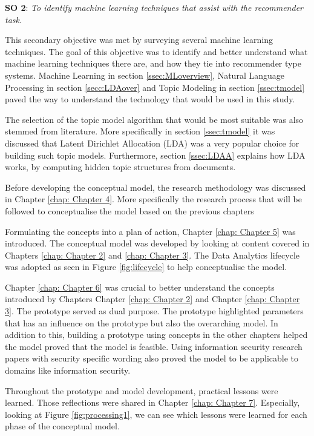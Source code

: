 \textbf{SO 2}: \textit{To identify machine learning techniques that assist with the recommender task.}

This secondary objective was met by surveying several machine learning techniques. The goal of this objective was to identify and better understand what machine learning techniques there are, and how they tie into recommender type systems.
Machine Learning in section \ref{ssec:MLoverview}, Natural Language Processing in section \ref{secc:LDAover} and Topic Modeling in section \ref{ssec:tmodel} paved the way to understand the technology that would be used in this study.

The selection of the topic model algorithm that would be most suitable was also stemmed from literature. More specifically in section \ref{ssec:tmodel} it was discussed that Latent Dirichlet Allocation (LDA) was a very popular choice for building such topic models. Furthermore, section \ref{ssec:LDAA} explains how LDA works, by computing hidden topic structures from documents.

Before developing the conceptual model, the research methodology was discussed in Chapter \ref{chap: Chapter 4}. More specifically the research process that will be followed to conceptualise the model based on the previous chapters

Formulating the concepts into a plan of action, Chapter \ref{chap: Chapter 5} was introduced. The conceptual model was developed by looking at content covered in Chapters \ref{chap: Chapter 2} and \ref{chap: Chapter 3}. The Data Analytics lifecycle was adopted as seen in Figure \ref{fig:lifecycle} to help conceptualise the model.

Chapter \ref{chap: Chapter 6} was crucial to better understand the concepts introduced by Chapters Chapter \ref{chap: Chapter 2} and Chapter \ref{chap: Chapter 3}. The prototype served as dual purpose. The prototype highlighted parameters that has an influence on the prototype but also the overarching model. In addition to this, building a prototype using concepts in the other chapters helped the model proved that the model is feasible. Using information security research papers with security specific wording also proved the model to be applicable to domains like information security.

Throughout the prototype and model development, practical lessons were learned. Those reflections 
were shared in Chapter \ref{chap: Chapter 7}. Especially, looking at Figure \ref{fig:processing1}, we can see which lessons were learned for each phase of the conceptual model.

